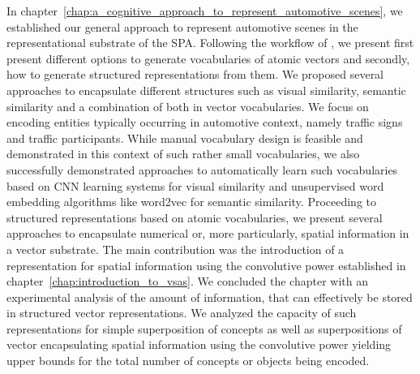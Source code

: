 In chapter~\ref{chap:a_cognitive_approach_to_represent_automotive_scenes}, we established our general approach to represent automotive scenes in the representational substrate of the \ac{SPA}.
Following the workflow of \cite{Gallant2013}, we present first present different options to generate vocabularies of atomic vectors and secondly, how to generate structured representations from them. 
We proposed several approaches to encapsulate different structures such as visual similarity, semantic similarity and a combination of both in vector vocabularies.
We focus on encoding entities typically occurring in automotive context, namely traffic signs and traffic participants.
While manual vocabulary design is feasible and demonstrated in this context of such rather small vocabularies, we also successfully demonstrated approaches to automatically learn such vocabularies based on \ac{CNN} learning systems for visual similarity and unsupervised word embedding algorithms like word2vec for semantic similarity.
Proceeding to structured representations based on atomic vocabularies, we present several approaches to encapsulate numerical or, more particularly, spatial information in a vector substrate.
The main contribution was the introduction of a representation for spatial information using the convolutive power established in chapter~\ref{chap:introduction_to_vsas}.
We concluded the chapter with an experimental analysis of the amount of information, that can effectively be stored in structured vector representations.
We analyzed the capacity of such representations for simple superposition of concepts as well as superpositions of vector encapsulating spatial information using the convolutive power yielding upper bounds for the total number of concepts or objects being encoded.
 
